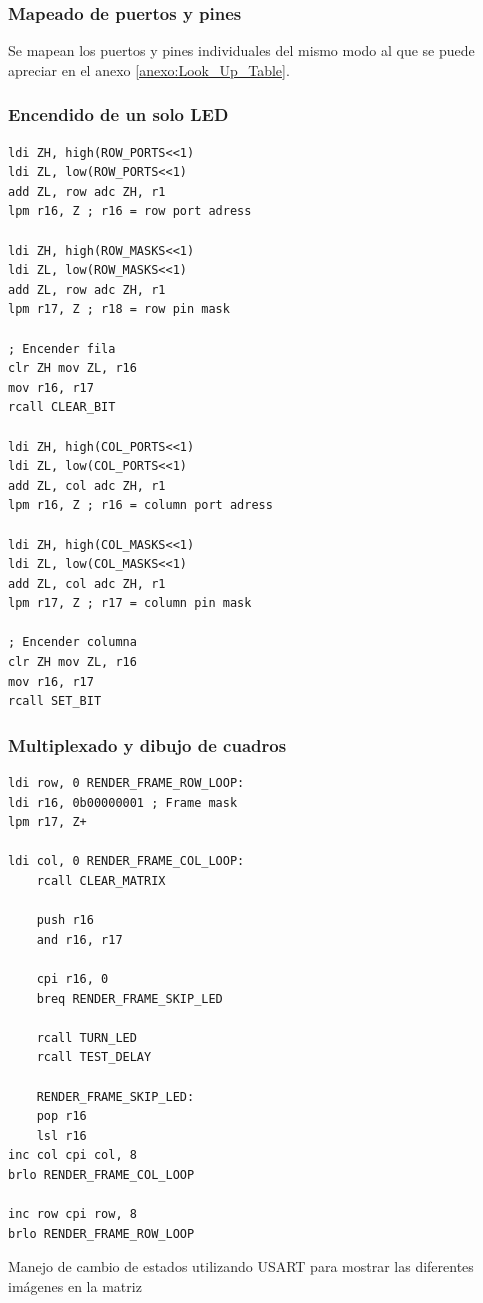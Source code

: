 \subsubsection{Mapeado de puertos y pines}
Se mapean los puertos y pines individuales del mismo modo al que se puede apreciar en el anexo \ref{anexo:Look_Up_Table}.

\subsubsection{Encendido de un solo LED}
\begin{verbatim}
ldi ZH, high(ROW_PORTS<<1) 
ldi ZL, low(ROW_PORTS<<1)
add ZL, row adc ZH, r1  
lpm r16, Z ; r16 = row port adress
        
ldi ZH, high(ROW_MASKS<<1) 
ldi ZL, low(ROW_MASKS<<1)
add ZL, row adc ZH, r1
lpm r17, Z ; r18 = row pin mask

; Encender fila
clr ZH mov ZL, r16 
mov r16, r17
rcall CLEAR_BIT

ldi ZH, high(COL_PORTS<<1) 
ldi ZL, low(COL_PORTS<<1)  
add ZL, col adc ZH, r1  
lpm r16, Z ; r16 = column port adress

ldi ZH, high(COL_MASKS<<1) 
ldi ZL, low(COL_MASKS<<1)  
add ZL, col adc ZH, r1  
lpm r17, Z ; r17 = column pin mask

; Encender columna
clr ZH mov ZL, r16 
mov r16, r17
rcall SET_BIT
\end{verbatim}

\subsubsection{Multiplexado y dibujo de cuadros}
\begin{verbatim}
ldi row, 0 RENDER_FRAME_ROW_LOOP:  
ldi r16, 0b00000001 ; Frame mask
lpm r17, Z+

ldi col, 0 RENDER_FRAME_COL_LOOP:
    rcall CLEAR_MATRIX

    push r16
    and r16, r17

    cpi r16, 0 
    breq RENDER_FRAME_SKIP_LED

    rcall TURN_LED
    rcall TEST_DELAY

    RENDER_FRAME_SKIP_LED:
    pop r16
    lsl r16
inc col cpi col, 8 
brlo RENDER_FRAME_COL_LOOP 

inc row cpi row, 8 
brlo RENDER_FRAME_ROW_LOOP
\end{verbatim}

Manejo de cambio de estados utilizando USART para mostrar las diferentes imágenes en la matriz

